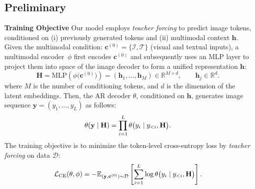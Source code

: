 \subsection{Preliminary}
\label{sec:Preliminary}
\textbf{Training Objective}
Our model employs \emph{teacher forcing} to predict image tokens, conditioned on (i) previously generated tokens and (ii) multimodal context $\mathbf{h}$. 
Given the multimodal condition: $\mathbf{c}^{(0)} = \{\mathcal{I}, \mathcal{T}\}$ (visual and textual inputs),
a multimodal encoder~\(\phi\) first encodes $\mathbf{c}^{(0)}$ and subsequently uses an MLP layer to project them into space of the image decoder to form a unified representation $\mathbf{h}$:
\begin{equation}
    \mathbf{H} = \text{MLP}(\phi\bigl(\mathbf{c}^{(0)}\bigr))
    = (\mathbf{h}_1, \dots, \mathbf{h}_{M}) \in \mathbb{R}^{M\times d}, \qquad \mathbf{h}_j \in \mathbb{R}^{d}.
    \label{eq:enc}
\end{equation}
where $M$ is the number of conditioning tokens, and $d$ is the dimension of the latent embeddings.
Then, the AR decoder $\theta$, conditioned on $\mathbf{h}$, generates image sequence $\mathbf{y} = (y_1, \dots, y_L)$ as follows:
\begin{equation}
    \small
    \theta(\mathbf{y} \mid \mathbf{H}) = \prod_{i=1}^{L} \theta\bigl(y_i \mid y_{<i}, \mathbf{H}\bigr).
    \label{eq:factor}
\end{equation}
The training objective is to minimize the token-level cross-entropy loss by \emph{teacher forcing} on data $\mathcal{D}$:
\begin{equation}
\small
    \mathcal{L}_{\text{CE}}(\theta, \phi)
    = -\mathbb{E}_{(\mathbf{y}, \mathbf{c}^{(0)}) \sim \mathcal{D}}
    \left[
        \sum_{i=1}^{L}
        \log \theta\bigl(y_i \mid y_{<i}, \mathbf{H} \bigr)
    \right].
    \label{eq:ce}
\end{equation}


